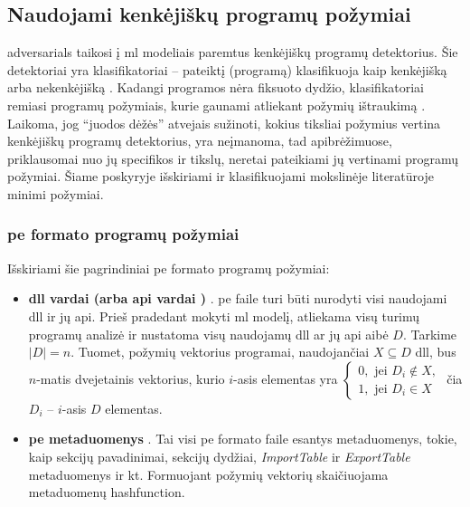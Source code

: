 \subsection{Naudojami kenkėjiškų programų požymiai}\label{sec:literature:features}
\Glspl{adversarial} taikosi į \gls{ml} modeliais paremtus kenkėjiškų programų detektorius. Šie detektoriai yra klasifikatoriai -- pateiktį (programą) klasifikuoja kaip kenkėjišką  arba nekenkėjišką . Kadangi programos nėra fiksuoto dydžio, klasifikatoriai remiasi programų požymiais, kurie gaunami atliekant požymių ištraukimą . Laikoma, jog \enquote{juodos dėžės} atvejais sužinoti, kokius tiksliai požymius vertina kenkėjiškų programų detektorius, yra neįmanoma, tad  apibrėžimuose, priklausomai nuo jų specifikos ir tikslų, neretai pateikiami jų vertinami programų požymiai. Šiame poskyryje išskiriami ir klasifikuojami mokslinėje literatūroje minimi požymiai.

\subsubsection{\gls{pe} formato programų požymiai}\label{sec:literature:features:pe}
Išskiriami šie pagrindiniai \gls{pe} formato programų požymiai:
\begin{itemize}
    \item \textbf{\gls{dll} vardai (arba \gls{api} vardai \cite{huGeneratingAdversarialMalware2017})} \cite{zhongMalFoxCamouflagedAdversarial2024}. \gls{pe} faile turi būti nurodyti visi naudojami \gls{dll} ir jų \gls{api}. Prieš pradedant mokyti \gls{ml} modelį, atliekama visų turimų programų analizė ir nustatoma visų naudojamų \gls{dll} ar jų \gls{api} aibė $D$. Tarkime $|D| = n$. Tuomet, požymių vektorius programai, naudojančiai $X \subseteq D$ \gls{dll}, bus $n$-matis dvejetainis vektorius, kurio $i$-asis elementas yra $\begin{cases}
        0, \text{ jei } D_i \not \in X, \\
        1, \text{ jei } D_i \in X
    \end{cases}$ čia $D_i$ -- $i$-asis $D$ elementas.
    \item \textbf{\gls{pe} metaduomenys} \cite{andersonLearningEvadeStatic2018}. Tai visi \gls{pe} formato faile esantys metaduomenys, tokie, kaip sekcijų pavadinimai, sekcijų dydžiai, \textit{ImportTable} ir \textit{ExportTable} metaduomenys ir kt. Formuojant požymių vektorių skaičiuojama metaduomenų \gls{hashfunction}.
\end{itemize}

